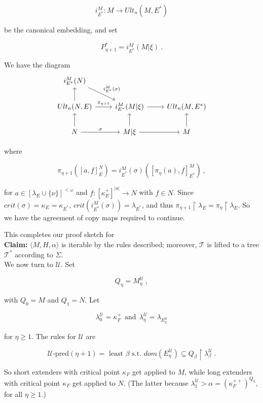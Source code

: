 \documentclass[12pt]{article}
\begin{document}
\[
i_{E^*}^M : M \longrightarrow Ult_n (M, E^*)
\]

be the canonical embedding, and set

\[
P_{\eta + 1}^* = i_{E^*}^M (M | \xi) \ .
\]

We have the diagram\\

\[
\begin{tikzcd}
i_{E^*}^M (N) \arrow[to=2-2, "i_{E^*}^M (\sigma)"] & & \\
Ult_n (N, E) \arrow[u] \arrow[r, "\pi_{\eta + 1}"] & i_{E^*}^M (M | \xi ) \arrow[r] & Ult_n (M, E^*)\\
N \arrow[u] \arrow[r, "\sigma"] & M | \xi \arrow[u] \arrow{r} & M \arrow[u]
\end{tikzcd}
\]

where

\[
\pi_{\eta + 1} ( [a, f]_E^N) = i_{E^*}^M (\sigma) ( [ \pi_\eta (a) , f ]_{E^*}^M ) \ ,
\]

for $a \in [ \lambda_E \cup \{ \nu \} ]^{< \omega}$ and $f: [ \kappa_E^+ ]^{|a|} \longrightarrow N$ with $f \in N$.  Since $crit( \sigma) = \kappa_E = \kappa_{E^*}$, $crit(i_{E^*}^M (\sigma)) = \lambda_{E^*}$, and thus $\pi_{\eta + 1} \restriction \lambda_E = \pi_\eta \restriction \lambda_E$.  So we have the agreement of copy maps required to continue.

This completes our proof sketch for\\

\textbf{Claim:} $\langle M , H, \alpha \rangle$ is iterable by the rules described; moreover, $\mathscr{T}$ is lifted to a tree $\mathscr{T}^*$ according to $\Sigma$.\\

We now turn to $\mathscr{U}$.  Set

\[
Q_\eta = M_\eta^{\mathscr{U}} \ ,
\]

with $Q_0 = M$ and $Q_1 = N$.  Let

\[
\lambda_0^{\mathscr{U}} = \kappa_F^+  \ \ \text{and} \ \ \lambda_\eta^{\mathscr{U}} = \lambda_{E_\eta^{\mathscr{U}}}
\]

for $\eta \geq 1$.  The rules for $\mathscr{U}$ are

\[
\mathscr{U} \text{-pred} (\eta + 1) = \text{ least } \beta \text{ s.t. } dom(E_\eta^{\mathscr{U}}) \subseteq Q_\beta \restriction \lambda_\beta^{\mathscr{U}} \ .
\]

So short extenders with critical point $\kappa_F$ get applied to $M$, while long extenders with critical point $\kappa_F$ get applied to $N$.  (The latter because $\lambda_1^{\mathscr{U}} > \alpha = ( \kappa_F^{++})^{Q_\eta}$, for all $\eta \geq 1$.)\\
\end{document}
